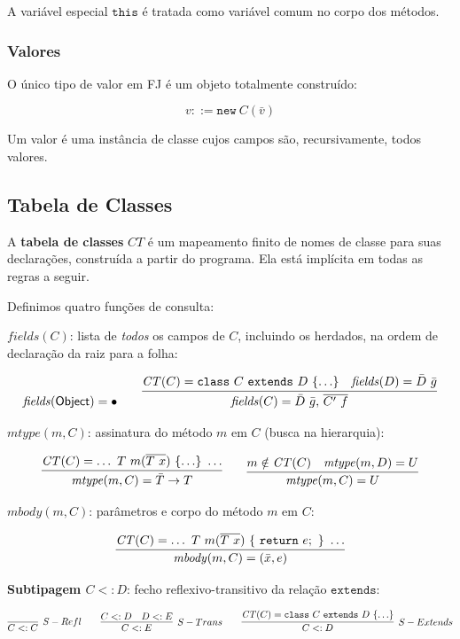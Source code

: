 A variável especial \(\mathtt{this}\) é tratada como variável comum
no corpo dos métodos.

\subsubsection{Valores}

O único tipo de valor em FJ é um objeto totalmente construído:

\[ v ::= \mathtt{new}\ C(\bar{v}) \]

Um valor é uma instância de classe cujos campos são, recursivamente,
todos valores.

\subsection{Tabela de Classes}

A \textbf{tabela de classes} \(\mathit{CT}\) é um mapeamento finito
de nomes de classe para suas declarações, construída a partir do
programa. Ela está implícita em todas as regras a seguir.

Definimos quatro funções de consulta:

\textbf{\(\mathit{fields}(C)\)}: lista de \emph{todos} os campos
de \(C\), incluindo os herdados, na ordem de declaração da raiz para a folha:

\[ \mathit{fields}(\mathsf{Object}) = \bullet \qquad \infer{\mathit{fields}(C)
  = \bar{D}\ \bar{g},\, \overline{C'\ f}}{\mathit{CT}(C) = \mathtt{class}\ C\
\mathtt{extends}\ D\ \{\ldots\} \quad \mathit{fields}(D) = \bar{D}\ \bar{g}} \]

\textbf{\(\mathit{mtype}(m, C)\)}: assinatura do método \(m\) em
\(C\) (busca na hierarquia):

\[ \infer{\mathit{mtype}(m, C) = \bar{T} \to T}{\mathit{CT}(C) = \ldots\ T\
  m(\overline{T\ x})\ \{\ldots\}\ \ldots} \qquad \infer{\mathit{mtype}(m, C) =
U}{m \notin \mathit{CT}(C) \quad \mathit{mtype}(m, D) = U} \]

\textbf{\(\mathit{mbody}(m, C)\)}: parâmetros e corpo do método
\(m\) em \(C\):

\[ \infer{\mathit{mbody}(m, C) = (\bar{x}, e)}{\mathit{CT}(C) = \ldots\ T\
m(\overline{T\ x})\ \{\ \mathtt{return}\ e;\ \}\ \ldots} \]

\textbf{Subtipagem \(C <: D\)}: fecho reflexivo-transitivo da
relação \(\mathtt{extends}\):

\[ \infer[S-Refl]{C <: C}{} \qquad \infer[S-Trans]{C <: E}{C <: D \quad D <: E}
  \qquad \infer[S-Extends]{C <: D}{\mathit{CT}(C) = \mathtt{class}\ C\
\mathtt{extends}\ D\ \{\ldots\}} \]

